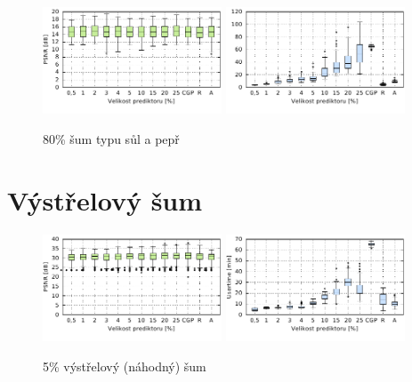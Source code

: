 \begin{figure}[H]
    \centering
    \includegraphics[width=0.475\textwidth]{fig/plot/compare/saltpepper80-100kg-psnrtest.pdf}
    \hskip0.5cm
    \includegraphics[width=0.475\textwidth]{fig/plot/compare/saltpepper80-100kg-usertime.pdf}
    \caption{80\% šum typu sůl a pepř}
\end{figure}




\section{Výstřelový šum}


\begin{figure}[H]
    \centering
    \includegraphics[width=0.475\textwidth]{fig/plot/compare/impulse5-100kg-psnrtest.pdf}
    \hskip0.5cm
    \includegraphics[width=0.475\textwidth]{fig/plot/compare/impulse5-100kg-usertime.pdf}
    \caption{5\% výstřelový (náhodný) šum}
\end{figure}

